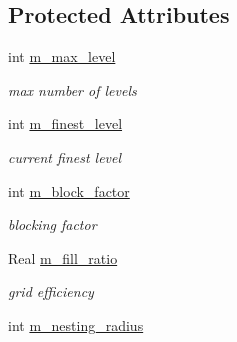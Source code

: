 \subsection*{Protected Attributes}
\begin{DoxyCompactItemize}
\item 
\hypertarget{classamr_mushy_layer_a0ed2056249b7a069ef3fb4c647296ad2}{int \hyperlink{classamr_mushy_layer_a0ed2056249b7a069ef3fb4c647296ad2}{m\-\_\-max\-\_\-level}}\label{classamr_mushy_layer_a0ed2056249b7a069ef3fb4c647296ad2}

\begin{DoxyCompactList}\small\item\em max number of levels \end{DoxyCompactList}\item 
\hypertarget{classamr_mushy_layer_a6b145b4cac6888a210bf843b2dc21dd8}{int \hyperlink{classamr_mushy_layer_a6b145b4cac6888a210bf843b2dc21dd8}{m\-\_\-finest\-\_\-level}}\label{classamr_mushy_layer_a6b145b4cac6888a210bf843b2dc21dd8}

\begin{DoxyCompactList}\small\item\em current finest level \end{DoxyCompactList}\item 
\hypertarget{classamr_mushy_layer_a03bc5211ae05d30d1a5cd479fe3cf244}{int \hyperlink{classamr_mushy_layer_a03bc5211ae05d30d1a5cd479fe3cf244}{m\-\_\-block\-\_\-factor}}\label{classamr_mushy_layer_a03bc5211ae05d30d1a5cd479fe3cf244}

\begin{DoxyCompactList}\small\item\em blocking factor \end{DoxyCompactList}\item 
\hypertarget{classamr_mushy_layer_adda79971726f270ea425a31e3d4348e4}{Real \hyperlink{classamr_mushy_layer_adda79971726f270ea425a31e3d4348e4}{m\-\_\-fill\-\_\-ratio}}\label{classamr_mushy_layer_adda79971726f270ea425a31e3d4348e4}

\begin{DoxyCompactList}\small\item\em grid efficiency \end{DoxyCompactList}\item 
\hypertarget{classamr_mushy_layer_a904ac67217c2d87e38be674ffdd07ea7}{int \hyperlink{classamr_mushy_layer_a904ac67217c2d87e38be674ffdd07ea7}{m\-\_\-nesting\-\_\-radius}}\label{classamr_mushy_layer_a904ac67217c2d87e38be674ffdd07ea7}


\end{DoxyCompactItemize}
